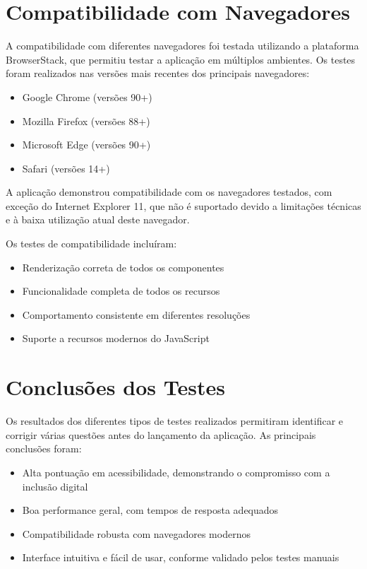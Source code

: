 \section{Compatibilidade com Navegadores}

A compatibilidade com diferentes navegadores foi testada utilizando a plataforma BrowserStack, que permitiu testar a aplicação em múltiplos ambientes. Os testes foram realizados nas versões mais recentes dos principais navegadores:

\begin{itemize}
    \item Google Chrome (versões 90+)
    \item Mozilla Firefox (versões 88+)
    \item Microsoft Edge (versões 90+)
    \item Safari (versões 14+)
\end{itemize}

A aplicação demonstrou compatibilidade com os navegadores testados, com exceção do Internet Explorer 11, que não é suportado devido a limitações técnicas e à baixa utilização atual deste navegador.

Os testes de compatibilidade incluíram:
\begin{itemize}
    \item Renderização correta de todos os componentes
    \item Funcionalidade completa de todos os recursos
    \item Comportamento consistente em diferentes resoluções
    \item Suporte a recursos modernos do JavaScript
\end{itemize}

\section{Conclusões dos Testes}

Os resultados dos diferentes tipos de testes realizados permitiram identificar e corrigir várias questões antes do lançamento da aplicação. As principais conclusões foram:

\begin{itemize}
    \item Alta pontuação em acessibilidade, demonstrando o compromisso com a inclusão digital
    \item Boa performance geral, com tempos de resposta adequados
    \item Compatibilidade robusta com navegadores modernos
    \item Interface intuitiva e fácil de usar, conforme validado pelos testes manuais
\end{itemize}

